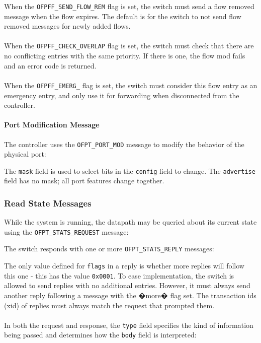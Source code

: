 
When the \verb|OFPFF_SEND_FLOW_REM| flag is set, the switch must send a flow removed message when the flow expires.  The default is for the switch to not send flow removed messages for newly added flows.  
\\\\
When the \verb|OFPFF_CHECK_OVERLAP| flag is set, the switch must check that there are no conflicting entries with the same priority. If there is one, the flow mod fails and an error code is returned.
\\\\
When the \verb|OFPFF_EMERG_| flag is set, the switch must consider this flow entry as an emergency entry, and only use it for forwarding when disconnected from the controller.

\paragraph{Port Modification Message}
The controller uses the \verb|OFPT_PORT_MOD| message to modify the behavior of the physical port:


The \verb|mask| field is used to select bits in the \verb|config| field to change.  The \verb|advertise| field has no mask; all port features change together.

\subsubsection{Read State Messages}
While the system is running, the datapath may be queried about its current state using the \verb|OFPT_STATS_REQUEST| message:


The switch responds with one or more \verb|OFPT_STATS_REPLY| messages:


The only value defined for \verb|flags| in a reply is whether more replies will follow this one - this has the value \verb|0x0001|.  To ease implementation, the switch is allowed to send replies with no additional entries.  However, it must always send another reply following a message with the �more� flag set.  The transaction ids (xid) of replies must always match the request that prompted them.
\\\\
In both the request and response, the \verb|type| field specifies the kind of information being passed and determines how the \verb|body| field is interpreted:

